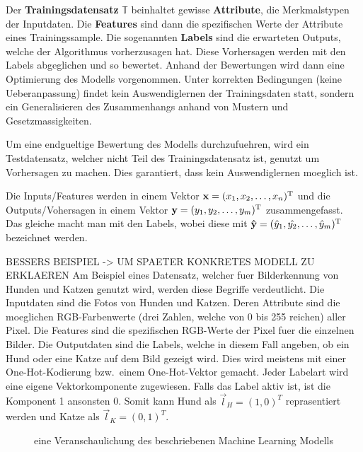 \documentclass[../main]{subfiles}
\begin{document}
Der \textbf{Trainingsdatensatz} $\mathbb{T}$ beinhaltet gewisse \textbf{Attribute}, die Merkmalstypen der Inputdaten.
Die \textbf{Features} sind dann die spezifischen Werte der Attribute eines Trainingssample.
Die sogenannten \textbf{Labels} sind die erwarteten Outputs, welche der Algorithmus vorherzusagen hat.
Diese Vorhersagen werden mit den Labels abgeglichen und so bewertet.
Anhand der Bewertungen wird dann eine Optimierung des Modells vorgenommen.
Unter korrekten Bedingungen (keine Ueberanpassung) findet kein Auswendiglernen der Trainingsdaten statt,
sondern ein Generalisieren des Zusammenhangs anhand von Mustern und Gesetzmassigkeiten.
\par\medskip
Um eine endgueltige Bewertung des Modells durchzufuehren, wird ein Testdatensatz, welcher nicht Teil des Trainingsdatensatz ist, genutzt um Vorhersagen zu machen.
Dies garantiert, dass kein Auswendiglernen moeglich ist.
\par\medskip
Die Inputs/Features werden in einem Vektor $\vec{x}=\trs{(x_1,x_2,\ldots,x_n)}$ und die Outputs/Vohersagen in einem Vektor $\vec{y}=\trs{(y_1,y_2,\ldots,y_m)}$ zusammengefasst.
Das gleiche macht man mit den Labels, wobei diese mit $\vec{\hat{y}}=\trs{(\hat{y}_1,\hat{y_2},\ldots,\hat{y}_m)}$ bezeichnet werden.
\par \medskip
BESSERS BEISPIEL -> UM SPAETER KONKRETES MODELL ZU ERKLAEREN
Am Beispiel eines Datensatz, welcher fuer Bilderkennung von Hunden und Katzen genutzt wird, werden diese Begriffe verdeutlicht.
Die Inputdaten sind die Fotos von Hunden und Katzen. Deren Attribute sind die moeglichen RGB-Farbenwerte (drei Zahlen, welche von 0 bis 255 reichen) aller Pixel.
Die Features sind die spezifischen RGB-Werte der Pixel fuer die einzelnen Bilder. Die Outputdaten sind die Labels, welche in diesem Fall angeben, ob ein Hund oder eine Katze auf dem Bild gezeigt wird.
Dies wird meistens mit einer One-Hot-Kodierung bzw.\ einem One-Hot-Vektor
gemacht. Jeder Labelart wird eine eigene Vektorkomponente zugewiesen. Falls das
Label aktiv ist, ist die Komponent 1 ansonsten 0. Somit kann Hund als $\vec{l}_H={(1,0)}^T$ reprasentiert werden und Katze als $\vec{l}_K={(0,1)}^T$.

\begin{figure}[h!]
  \centering
  \begin{tikzpicture}[node distance=5cm,auto]

  \end{tikzpicture}

  \caption{eine Veranschaulichung des beschriebenen Machine Learning Modells}
\end{figure}
\end{document}
